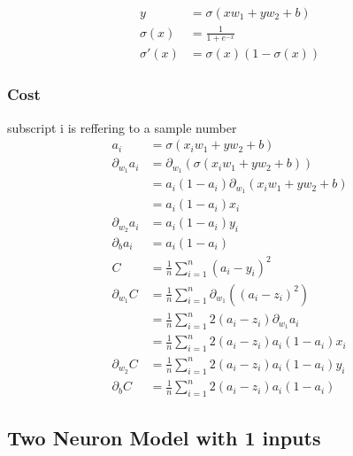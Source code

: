 \documentclass{article}
\begin{document}
\begin{align}
    y &= \sigma(xw_1 + yw_2 + b) \\
    \sigma(x) &= \frac{1}{1 + e^{-x}} \\
    \sigma'(x) &= \sigma(x)(1 - \sigma(x)) 
\end{align}

\newpage

\subsubsection{Cost}

\def\pd[#1]{\partial_{#1}}
\def\avgsum[#1,#2]{\frac{1}{#2}\sum_{#1=1}^{#2}}

subscript i is reffering to a sample number
\begin{align}
    a_i &= \sigma(x_iw_1 + yw_2 +b) \\
    \pd[w_1]a_i 
        &= \pd[w_1](\sigma(x_iw_1 + yw_2 + b)) \\
        &= a_i(1 - a_i)\pd[w_1](x_iw_1 + yw_2 + b) \\
        &= a_i(1 - a_i)x_i \\
    \pd[w_2]a_i
        &= a_i(1 - a_i)y_i \\
    \pd[b]a_i
        &= a_i(1 - a_i) \\
    C &= \avgsum[i,n](a_i - y_i)^2 \\
    \pd[w_1]C 
        &= \avgsum[i, n]\pd[w_1]\left((a_i - z_i)^2\right) \\
        &= \avgsum[i, n]2(a_i - z_i)\pd[w_1]a_i \\
        &= \avgsum[i, n]2(a_i - z_i)a_i(1 - a_i)x_i \\
    \pd[w_2]C
        &= \avgsum[i, n]2(a_i - z_i)a_i(1 - a_i)y_i \\
    \pd[b]C
        &= \avgsum[i, n]2(a_i - z_i)a_i(1 - a_i)
\end{align}

\subsection{Two Neuron Model with 1 inputs}

\def\d{2.0}
\def\s[#1]{^{(#1)}}
\begin{center}
\end{center}
\end{document}

